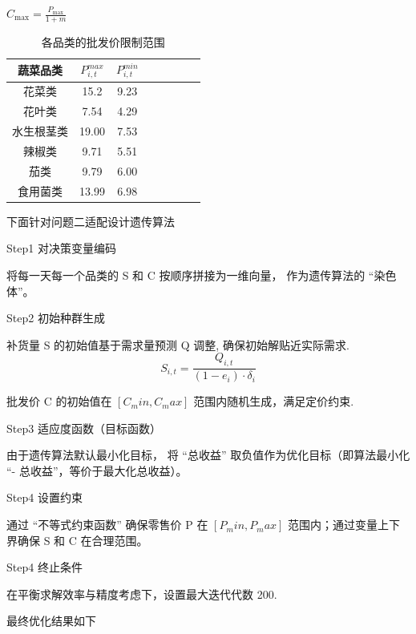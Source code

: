 \documentclass{cumcmthesis}
\begin{document}
$C_{\text{max}} = \frac{P_{\text{max}}}{1+m}$


\begin{table}[H]
\centering
\begin{tabular}{cccccccc}
\hline
蔬菜品类 &  $P_{i,t}^{max}$ & $P_{i,t}^{min}$ \\
\hline
花菜类 & 15.2 & 9.23 \\
花叶类 & 7.54 & 4.29 \\
水生根茎类 & 19.00 & 7.53 \\
辣椒类 & 9.71 & 5.51 \\
茄类 &  9.79 & 6.00 \\
食用菌类 & 13.99 & 6.98 \\
\hline
\end{tabular}
\caption{各品类的批发价限制范围}
\label{tab:best_models}
\end{table}

下面针对问题二适配设计遗传算法

Step1 对决策变量编码

将每一天每一个品类的 S 和 C 按顺序拼接为一维向量，
作为遗传算法的 “染色体”。

Step2 初始种群生成

补货量 S 的初始值基于需求量预测 Q 调整, 确保初始解贴近实际需求. 
\[
    S_{i,t}=\frac{Q_{i,t}}{(1-e_i) \cdot  \delta_i}
\]

批发价 C 的初始值在 $[C_min, C_max]$ 范围内随机生成，满足定价约束. 

Step3 适应度函数（目标函数）

由于遗传算法默认最小化目标，
将 “总收益” 取负值作为优化目标（即算法最小化
 “- 总收益”，等价于最大化总收益）。

Step4 设置约束

通过 “不等式约束函数” 确保零售价 
P 在 $[P_min, P_max]$ 范围内；通过变量上下界确保 S 和 C 在合理范围。

Step4 终止条件

在平衡求解效率与精度考虑下，设置最大迭代代数 200. 

最终优化结果如下
\end{document}
